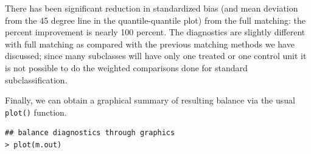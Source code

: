\documentclass[oneside,letterpaper,titlepage]{article}
\begin{document}
There has been significant reduction in standardized bias (and mean
deviation from the 45 degree line in the quantile-quantile plot) from
the full matching: the percent improvement is nearly 100 percent.  The
diagnostics are slightly different with full matching as compared with
the previous matching methods we have discussed; since many subclasses
will have only one treated or one control unit it is not possible to
do the weighted comparisons done for standard subclassification.

Finally, we can obtain a graphical summary of resulting balance via
the usual {\tt plot()} function.
\begin{verbatim}
## balance diagnostics through graphics
> plot(m.out)
\end{verbatim}
\end{document}
